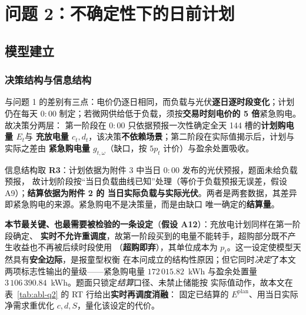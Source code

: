 
\section{问题 2：不确定性下的日前计划}\label{chap:q2}

\subsection{模型建立}

\subsubsection{决策结构与信息结构}\label{sec:q2-struct}

与问题 1 的差别有三点：电价仍逐日相同，而负载与光伏\textbf{逐日逐时段变化}；计划仍在每天
\(0{:}00\) 制定；若微网供给低于负载，须按\textbf{交易时刻电价的 5 倍}紧急购电。故决策分两层：
第一阶段在 \(0{:}00\) 只依据预报一次性确定全天 144 槽的\textbf{计划购电量 \(E_t\)}与
\textbf{充放电量 \(c_t,d_t\)}，该决策\textbf{不依赖场景}；第二阶段在实际值揭示后，计划与实际之差由
\textbf{紧急购电量 \(g_{t,\omega}\)}（缺口，按 \(5p_t\) 计价）与盈余处置吸收。

信息结构取 \textbf{R3}：计划依据为附件 3 中当日 \(0{:}00\) 发布的光伏预报，题面未给负载预报，
故计划阶段按“当日负载曲线已知”处理（等价于负载预报无误差，假设 A9）；\textbf{结算依据为附件 2 的
当日实际负载与实际光伏}。两者是两套数据，其差异即紧急购电的来源。紧急购电不是决策量，而是由缺口
唯一确定的\textbf{结算量}。

\textbf{本节最关键、也最需要被检验的一条设定}（\textbf{假设 A12}）：充放电计划同样在第一阶段确定、
\textbf{实时不允许重调度}，故第一阶段买到的电量不能转手，超购部分既不产生收益也不再被后续时段使用
（\textbf{超购即弃}），其单位成本为 \(p_t\)。这一设定使模型天然具有\textbf{安全边际}，是报童型权衡
在本问成立的结构性原因；但它同时\emph{决定}了本文两项标志性输出的量级——紧急购电量
\(172\,015.82\)~kWh 与盈余处置量 \(3\,106\,390.84\)~kWh。题面只锁定\emph{结算}口径、未禁止储能按
实际值动作，故本文在 表~\ref{tab:abl-q2} 的 RT 行给出\textbf{实时再调度消融}：
固定已结算的 \(E^{\text{plan}}\)、用当日实际净需求重优化 \(c,d,S\)，量化该设定的代价。

